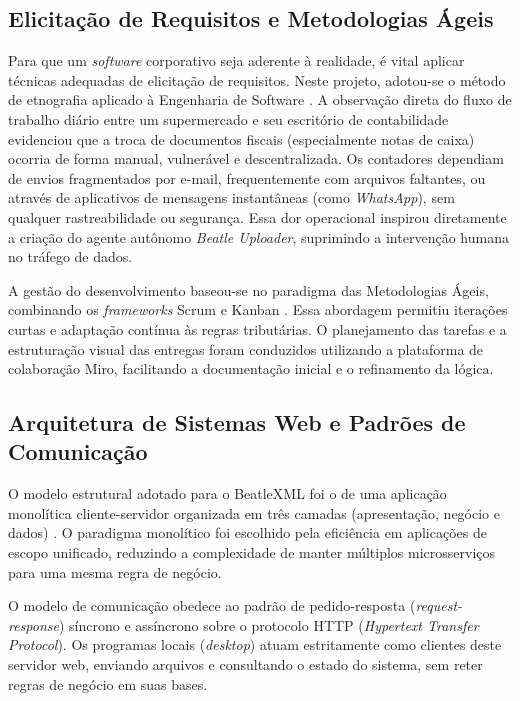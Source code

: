 \documentclass[12pt]{article}
\begin{document}
\subsection{Elicitação de Requisitos e Metodologias Ágeis}
Para que um \textit{software} corporativo seja aderente à realidade, é vital aplicar técnicas adequadas de elicitação de requisitos. Neste projeto, adotou-se o método de etnografia aplicado à Engenharia de Software \cite{sommerville2011}. A observação direta do fluxo de trabalho diário entre um supermercado e seu escritório de contabilidade evidenciou que a troca de documentos fiscais (especialmente notas de caixa) ocorria de forma manual, vulnerável e descentralizada. Os contadores dependiam de envios fragmentados por e-mail,  frequentemente com arquivos faltantes, ou através de aplicativos de mensagens instantâneas (como \textit{WhatsApp}), sem qualquer rastreabilidade ou segurança. Essa dor operacional inspirou diretamente a criação do agente autônomo \textit{Beatle Uploader}, suprimindo a intervenção humana no tráfego de dados.

A gestão do desenvolvimento baseou-se no paradigma das Metodologias Ágeis, combinando os \textit{frameworks} Scrum e Kanban \cite{pressman2016}. Essa abordagem permitiu iterações curtas e adaptação contínua às regras tributárias. O planejamento das tarefas e a estruturação visual das entregas foram conduzidos utilizando a plataforma de colaboração Miro, facilitando a documentação inicial e o refinamento da lógica.

\subsection{Arquitetura de Sistemas Web e Padrões de Comunicação}
O modelo estrutural adotado para o BeatleXML foi o de uma aplicação monolítica cliente-servidor organizada em três camadas (apresentação, negócio e dados) \cite{sommerville2011}. O paradigma monolítico foi escolhido pela eficiência em aplicações de escopo unificado, reduzindo a complexidade de manter múltiplos microsserviços para uma mesma regra de negócio. 

O modelo de comunicação obedece ao padrão de pedido-resposta (\textit{request-response}) síncrono e assíncrono sobre o protocolo HTTP (\textit{Hypertext Transfer Protocol}). Os programas locais (\textit{desktop}) atuam estritamente como clientes deste servidor web, enviando arquivos e consultando o estado do sistema, sem reter regras de negócio em suas bases.
\end{document}
